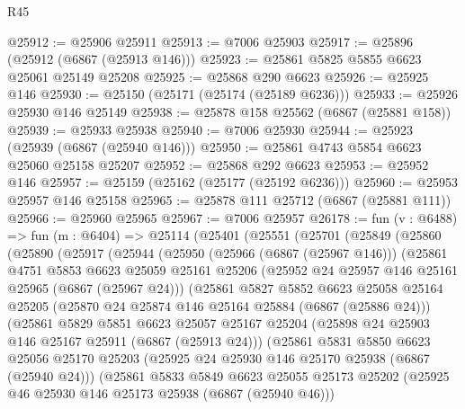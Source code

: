 \begin{lexlean}{R45}
\begin{coremodule}
{@25912 := @25906 @25911
@25913 := @7006 @25903
@25917 := @25896 (@25912 (@6867 (@25913 @146)))
@25923 := @25861 @5825 @5855 @6623 @25061 @25149 @25208
@25925 := @25868 @290 @6623
@25926 := @25925 @146
@25930 := @25150 (@25171 (@25174 (@25189 @6236)))
@25933 := @25926 @25930 @146 @25149
@25938 := @25878 @158 @25562 (@6867 (@25881 @158))
@25939 := @25933 @25938
@25940 := @7006 @25930
@25944 := @25923 (@25939 (@6867 (@25940 @146)))
@25950 := @25861 @4743 @5854 @6623 @25060 @25158 @25207
@25952 := @25868 @292 @6623
@25953 := @25952 @146
@25957 := @25159 (@25162 (@25177 (@25192 @6236)))
@25960 := @25953 @25957 @146 @25158
@25965 := @25878 @111 @25712 (@6867 (@25881 @111))
@25966 := @25960 @25965
@25967 := @7006 @25957
@26178 := fun (v : @6488) =>
  fun (m : @6404) =>
  @25114
    (@25401
      (@25551
        (@25701
          (@25849
            (@25860
              (@25890
                (@25917
                  (@25944
                    (@25950
                      (@25966 (@6867 (@25967 @146)))
                      (@25861
                        @4751
                        @5853
                        @6623
                        @25059
                        @25161
                        @25206
                        (@25952 @24 @25957 @146 @25161 @25965 (@6867 (@25967 @24)))
                        (@25861
                          @5827
                          @5852
                          @6623
                          @25058
                          @25164
                          @25205
                          (@25870 @24 @25874 @146 @25164 @25884 (@6867 (@25886 @24)))
                          (@25861
                            @5829
                            @5851
                            @6623
                            @25057
                            @25167
                            @25204
                            (@25898 @24 @25903 @146 @25167 @25911 (@6867 (@25913 @24)))
                            (@25861
                              @5831
                              @5850
                              @6623
                              @25056
                              @25170
                              @25203
                              (@25925 @24 @25930 @146 @25170 @25938 (@6867 (@25940 @24)))
                              (@25861
                                @5833
                                @5849
                                @6623
                                @25055
                                @25173
                                @25202
                                (@25925 @46 @25930 @146 @25173 @25938 (@6867 (@25940 @46)))
}
\end{coremodule}
\end{lexlean}
